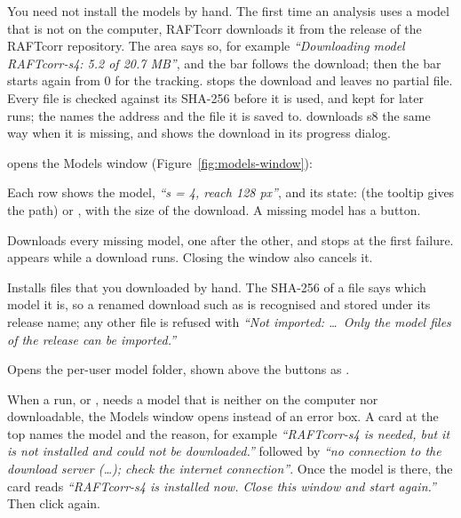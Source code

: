 You need not install the models by hand. The first time an analysis uses a model that is not on
the computer, RAFTcorr downloads it from the release  of the RAFTcorr repository.
The  area says so, for example \emph{``Downloading model RAFTcorr-s4: 5.2 of 20.7
MB''}, and the bar follows the download; then the bar starts again from 0 for the tracking.
 stops the download and leaves no partial file. Every file is checked against its
SHA-256 before it is used, and kept for later runs; the  names the address and the file
it is saved to.  downloads s8 the same way when it is missing, and shows the download in
its progress dialog.


 opens the Models window (Figure~\ref{fig:models-window}):

\begin{description}[leftmargin=0.6cm,style=nextline]
  \item[The model rows]
    Each row shows the model, \emph{``s = 4, reach 128 px''}, and its state:  (the
    tooltip gives the path) or , with the size of the download. A missing model
    has a  button.
  \item[Download All]
    Downloads every missing model, one after the other, and stops at the first failure.
     appears while a download runs. Closing the window also cancels it.
  \item[Import Model Files…]
    Installs  files that you downloaded by hand. The SHA-256 of a file says which model
    it is, so a renamed download such as  is recognised and stored under
    its release name; any other file is refused with \emph{``Not imported: \ldots\ Only the model
    files of the release can be imported.''}
  \item[Open Model Folder]
    Opens the per-user model folder, shown above the buttons as .
\end{description}

When a run, or , needs a model that is neither on the computer nor
downloadable, the Models window opens instead of an error box. A card at the top names the model
and the reason, for example \emph{``RAFTcorr-s4 is needed, but it is not installed and could not
be downloaded.''} followed by \emph{``no connection to the download server (\ldots); check the
internet connection''}. Once the model is there, the card reads \emph{``RAFTcorr-s4 is installed
now. Close this window and start again.''} Then click  again.

